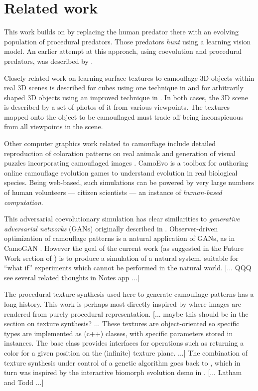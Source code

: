 \documentclass[sigconf]{acmart}
\newcommand{\jargon}[1]{\textit{#1}}
\begin{document}
\section{Related work}
This work builds on \citet{Reynolds2011} by replacing the human predator there with an evolving population of procedural predators. Those predators \jargon{hunt} using a learning vision model. An earlier attempt at this approach, using coevolution and procedural predators, was described by \citet{harrington_coevolution_2014}.
\par
Closely related work on learning surface textures to camouflage 3D objects within real 3D scenes is described for cubes using one technique in \citet{owens_camouflaging_2014} and for arbitrarily shaped 3D objects using an improved technique in \citet{guo_ganmouflage_2022}. In both cases, the 3D scene is described by a set of photos of it from various viewpoints. The textures mapped onto the object to be camouflaged must trade off being inconspicuous from all viewpoints in the scene.
\par
Other computer graphics work related to camouflage include detailed reproduction of coloration patterns on real animals \cite{de_gomensoro_malheiros_leopard_2020} and generation of visual puzzles incorporating camouflaged images \cite{chu_camo_image_2010} \cite{Zhang_Yin_Nie_Zheng_2020}. CamoEvo \cite{hancock_camoevo_2022} is a toolbox for authoring online camouflage evolution games to understand evolution in real biological species. Being web-based, such simulations can be powered by very large numbers of human volunteers — citizen scientists — an instance of \jargon{human-based computation}.
\par
This adversarial coevolutionary simulation has clear similarities to \jargon{generative adversarial networks} (GANs) originally described in \citet{goodfellow_gan_2014}. Observer-driven optimization of camouflage patterns is a natural application of GANs, as in CamoGAN \cite{talas_camogan_2020}. However the goal of the current work (as suggested in the Future Work section of \citet{Reynolds2011}) is to produce a simulation of a natural system, suitable for “what if” experiments which cannot be performed in the natural world. [... QQQ see several related thoughts in Notes app ...]
\par
The procedural texture synthesis used here to generate camouflage patterns has a long history. This work is perhaps most directly inspired by \citet{perlin_image_1985} where images are rendered from purely procedural representation. [... maybe this should be in the section on texture synthesis? ... These textures are object-oriented so specific types are implemented as (c++) classes, with specific parameters stored in instances. The base class provides interfaces for operations such as returning a color for a given position on the (infinite) texture plane. ...] The combination of texture synthesis under control of a genetic algorithm goes back to \citet{sims_artificial_1991}, which in turn was inspired by the interactive biomorph evolution demo in \citet{dawkins_blind_1986}. [... Latham and Todd ...]
\end{document}
